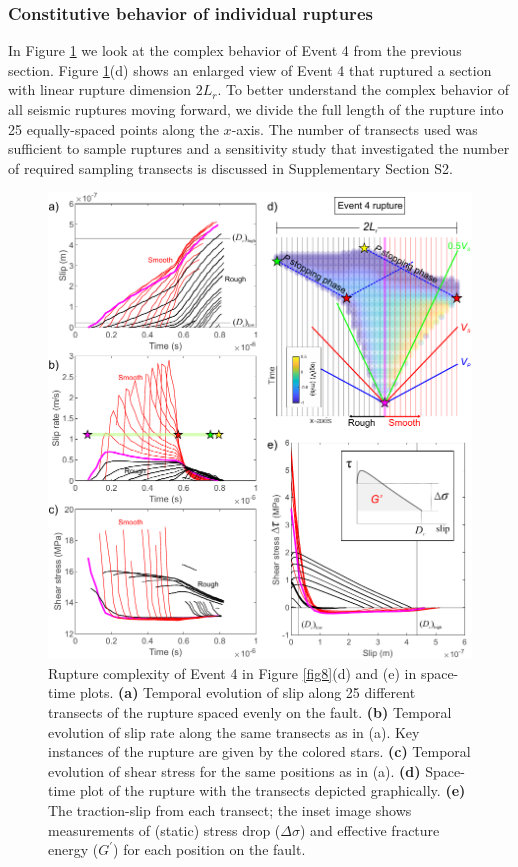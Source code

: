\documentclass[preprint,1p, 10pt,authoryear]{elsarticle}
\begin{document}
\subsubsection{Constitutive behavior of individual ruptures }
\label{Constitutive}
In Figure \ref{fig9} we look at the complex behavior of Event 4 from the previous section. Figure \ref{fig9}(d) shows an enlarged view of Event 4 that ruptured a section with linear rupture dimension $2L_{r}$.  To better understand the complex behavior of all seismic ruptures moving forward, we divide the full length of the rupture into 25 equally-spaced points along the $x$-axis. The number of transects used was sufficient to sample ruptures and a sensitivity study that investigated the number of required sampling transects is discussed in Supplementary Section S2.   

\begin{figure}
	\centering
	\includegraphics{FIG9_revised.pdf} 
	\caption{Rupture complexity of Event 4 in Figure \ref{fig8}(d) and (e) in space-time plots.  \textbf{(a)} Temporal evolution of slip along 25 different transects of the rupture spaced evenly on the fault. \textbf{(b)} Temporal evolution of slip rate along the same transects as in (a). Key instances of the rupture are given by the colored stars. \textbf{(c)} Temporal evolution of shear stress for the same positions as in (a). \textbf{(d)} Space-time plot of the rupture with the transects depicted graphically. \textbf{(e)} The traction-slip from each transect; the inset image shows measurements	 of (static) stress drop ($\Delta\sigma$) and effective fracture energy ($G^{'}$) for each position on the fault.}
	\label{fig9}
\end{figure}
\end{document}
